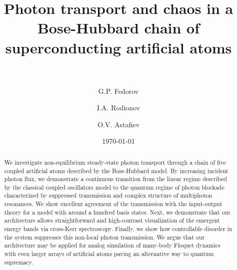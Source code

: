 \documentclass[%
 aps, pra,
 amsmath,amssymb,
 reprint,%
superscriptaddress
]{revtex4-2}
\newcommand{\mytitile}{Photon transport and chaos in a Bose-Hubbard chain of superconducting artificial atoms}
\begin{document}
	
	\title[\mytitile]{\mytitile\\~}
	\author{G.P. Fedorov}
	

	\author{I.A. Rodionov}

	\author{O.V. Astafiev}
%
	
	
	\date{\today}%
	
	
	\begin{abstract}
We investigate non-equilibrium steady-state photon transport through a chain of five coupled artificial atoms described by the Bose-Hubbard model. By increasing incident photon flux, we demonstrate a continuous transition from the linear regime described by the classical coupled oscillators model to the quantum regime of photon blockade characterized by suppressed transmission and complex structure of multiphoton resonances. We show excellent agreement of the transmission with the input-output theory for a model with around a hundred basis states. Next, we demonstrate that our architecture allows straightforward and high-contrast visualization of the emergent energy bands via cross-Kerr spectroscopy. Finally, we show how controllable disorder in the system suppresses this non-local photon transmission. We argue that our architecture may be applied for analog simulation of many-body Floquet dynamics with even larger arrays of artificial atoms paving an alternative way to quantum supremacy.
\end{abstract}
	
\maketitle
\end{document}
